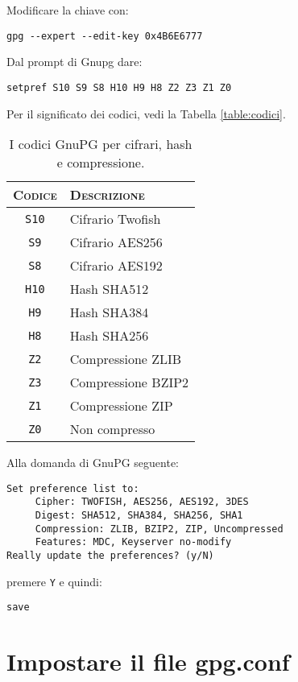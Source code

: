 Modificare la chiave con:

\begin{lstlisting}
gpg --expert --edit-key 0x4B6E6777
\end{lstlisting}

Dal prompt di Gnupg dare:

\begin{lstlisting}
setpref S10 S9 S8 H10 H9 H8 Z2 Z3 Z1 Z0
\end{lstlisting}

Per il significato dei codici, vedi la Tabella \vref{table:codici}.

\begin{table}
   \centering
	\begin{tabularx}{6cm}{cl}
 		\toprule
		\textsc{Codice} & \textsc{Descrizione} \\
		\midrule
		\texttt{S10} & Cifrario Twofish \\
		\texttt{S9}  & Cifrario AES256 \\
		\texttt{S8}  & Cifrario AES192 \\
		\texttt{H10} & Hash SHA512 \\
		\texttt{H9}  & Hash SHA384 \\
		\texttt{H8}  & Hash SHA256 \\
		\texttt{Z2}  & Compressione ZLIB \\
		\texttt{Z3}  & Compressione BZIP2 \\
		\texttt{Z1}  & Compressione ZIP \\
		\texttt{Z0}  & Non compresso \\
		\bottomrule
	\end{tabularx}
	\caption{I codici GnuPG per cifrari, hash e compressione.}
	\label{table:codici}
\end{table}

Alla domanda di GnuPG seguente:

\begin{lstlisting}
Set preference list to:
     Cipher: TWOFISH, AES256, AES192, 3DES
     Digest: SHA512, SHA384, SHA256, SHA1
     Compression: ZLIB, BZIP2, ZIP, Uncompressed
     Features: MDC, Keyserver no-modify
Really update the preferences? (y/N)
\end{lstlisting}

\noindent premere \texttt{Y} e quindi:

\begin{lstlisting}
save
\end{lstlisting}

\section{Impostare il file gpg.conf}

